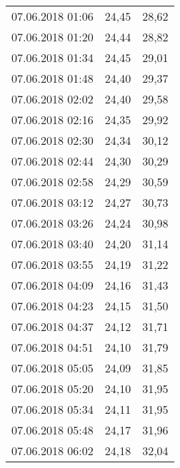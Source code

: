 \documentclass[a4paper,11pt,twoside]{article}
\begin{document}
\begin{longtable}[c]{ccc}
07.06.2018 01:06       & 24,45                & 28,62                          \\
07.06.2018 01:20       & 24,44                & 28,82                          \\
07.06.2018 01:34       & 24,45                & 29,01                          \\
07.06.2018 01:48       & 24,40                & 29,37                          \\
07.06.2018 02:02       & 24,40                & 29,58                          \\
07.06.2018 02:16       & 24,35                & 29,92                          \\
07.06.2018 02:30       & 24,34                & 30,12                          \\
07.06.2018 02:44       & 24,30                & 30,29                          \\
07.06.2018 02:58       & 24,29                & 30,59                          \\
07.06.2018 03:12       & 24,27                & 30,73                          \\
07.06.2018 03:26       & 24,24                & 30,98                          \\
07.06.2018 03:40       & 24,20                & 31,14                          \\
07.06.2018 03:55       & 24,19                & 31,22                          \\
07.06.2018 04:09       & 24,16                & 31,43                          \\
07.06.2018 04:23       & 24,15                & 31,50                          \\
07.06.2018 04:37       & 24,12                & 31,71                          \\
07.06.2018 04:51       & 24,10                & 31,79                          \\
07.06.2018 05:05       & 24,09                & 31,85                          \\
07.06.2018 05:20       & 24,10                & 31,95                          \\
07.06.2018 05:34       & 24,11                & 31,95                          \\
07.06.2018 05:48       & 24,17                & 31,96                          \\
07.06.2018 06:02       & 24,18                & 32,04                          \\

\end{longtable}
\end{document}
